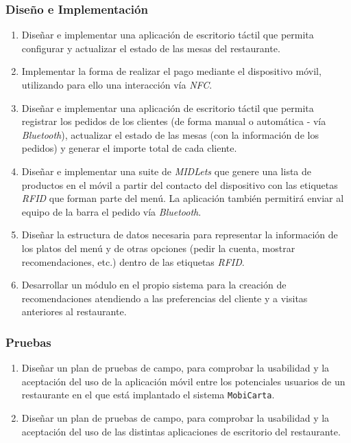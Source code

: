 \subsubsection{Diseño e Implementación}
\begin{enumerate}
\item Diseñar e implementar una aplicación de escritorio táctil que permita
  configurar y actualizar el estado de las mesas del restaurante.
\item Implementar la forma de realizar el pago mediante el dispositivo móvil,
  utilizando para ello una interacción vía \emph{NFC}.
\item Diseñar e implementar una aplicación de escritorio táctil que permita
  registrar los pedidos de los clientes (de forma manual o automática - vía
  \emph{Bluetooth}), actualizar el estado de las mesas (con la información de
  los pedidos) y generar el importe total de cada cliente.
\item Diseñar e implementar una suite de \emph{MIDLets} que genere una lista
  de productos en el móvil a partir del contacto del dispositivo con las
  etiquetas \emph{RFID} que forman parte del menú. La aplicación también
  permitirá enviar al equipo de la barra el pedido vía \emph{Bluetooth}.
\item Diseñar la estructura de datos necesaria para representar la
  información de los platos del menú y de otras opciones (pedir la cuenta, 
  mostrar recomendaciones, etc.) dentro de las etiquetas \emph{RFID}.
\item Desarrollar un módulo en el propio sistema para la creación de
  recomendaciones atendiendo a las preferencias del cliente y a visitas
  anteriores al restaurante.
\end{enumerate}

\subsubsection{Pruebas}
\begin{enumerate}
\item Diseñar un plan de pruebas de campo, para comprobar la usabilidad y
la aceptación del uso de la aplicación móvil entre los potenciales
usuarios de un restaurante en el que está implantado el sistema
\texttt{MobiCarta}.
\item Diseñar un plan de pruebas de campo, para comprobar la usabilidad y
la aceptación del uso de las distintas aplicaciones de escritorio del
restaurante.
\end{enumerate}



